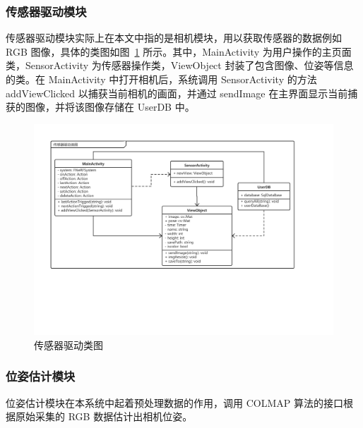 \subsubsection{传感器驱动模块}
传感器驱动模块实际上在本文中指的是相机模块，用以获取传感器的数据例如 RGB 图像，具体的类图如图~\ref{fig:sensorDriveCD} 所示。其中，MainActivity 为用户操作的主页面类，SensorActivity 为传感器操作类，ViewObject 封装了包含图像、位姿等信息的类。在 MainActivity 中打开相机后，系统调用 SensorActivity 的方法 addViewClicked 以捕获当前相机的画面，并通过 sendImage 在主界面显示当前捕获的图像，并将该图像存储在 UserDB 中。
\begin{figure}[htbp]
	\centering
	\includegraphics[width=0.95\linewidth]{figures/sensorDriveCD.pdf}
	\caption{传感器驱动类图}
	\label{fig:sensorDriveCD}
\end{figure}
\pagebreak
\subsubsection{位姿估计模块}
位姿估计模块在本系统中起着预处理数据的作用，调用 COLMAP\cite{schonberger2016structure} 算法的接口根据原始采集的 RGB 数据估计出相机位姿。

